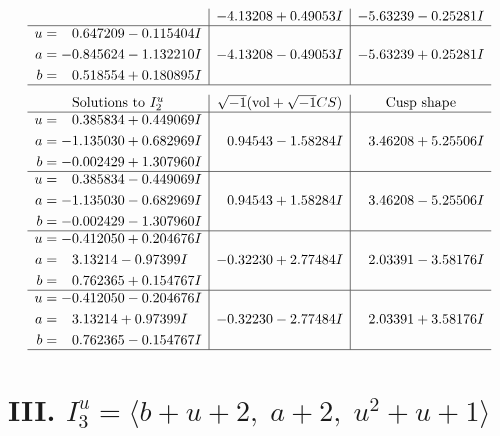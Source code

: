 \documentclass[1p]{elsarticle_modified}
\theoremstyle{definition}
\newcommand{\I}{\sqrt{-1}}
\begin{document}
$$\begin{array}{c|c|c}
 & -4.13208 + 0.49053 I & -5.63239 - 0.25281 I \\ \hline\begin{aligned}
u &= \phantom{-}0.647209 - 0.115404 I \\
a &= -0.845624 - 1.132210 I \\
b &= \phantom{-}0.518554 + 0.180895 I\end{aligned}
 & -4.13208 - 0.49053 I & -5.63239 + 0.25281 I\\
 \hline 
 \end{array}$$\newpage$$\begin{array}{c|c|c}  
\text{Solutions to }I^u_{2}& \I (\text{vol} + \sqrt{-1}CS) & \text{Cusp shape}\\
 \hline 
\begin{aligned}
u &= \phantom{-}0.385834 + 0.449069 I \\
a &= -1.135030 + 0.682969 I \\
b &= -0.002429 + 1.307960 I\end{aligned}
 & \phantom{-}0.94543 - 1.58284 I & \phantom{-}3.46208 + 5.25506 I \\ \hline\begin{aligned}
u &= \phantom{-}0.385834 - 0.449069 I \\
a &= -1.135030 - 0.682969 I \\
b &= -0.002429 - 1.307960 I\end{aligned}
 & \phantom{-}0.94543 + 1.58284 I & \phantom{-}3.46208 - 5.25506 I \\ \hline\begin{aligned}
u &= -0.412050 + 0.204676 I \\
a &= \phantom{-}3.13214 - 0.97399 I \\
b &= \phantom{-}0.762365 + 0.154767 I\end{aligned}
 & -0.32230 + 2.77484 I & \phantom{-}2.03391 - 3.58176 I \\ \hline\begin{aligned}
u &= -0.412050 - 0.204676 I \\
a &= \phantom{-}3.13214 + 0.97399 I \\
b &= \phantom{-}0.762365 - 0.154767 I\end{aligned}
 & -0.32230 - 2.77484 I & \phantom{-}2.03391 + 3.58176 I\\
 \hline 
 \end{array}$$\newpage\newpage\renewcommand{\arraystretch}{1}
\centering \section*{III. $I^u_{3}= \langle b+u+2,\;a+2,\;u^2+u+1 \rangle$}
\end{document}
